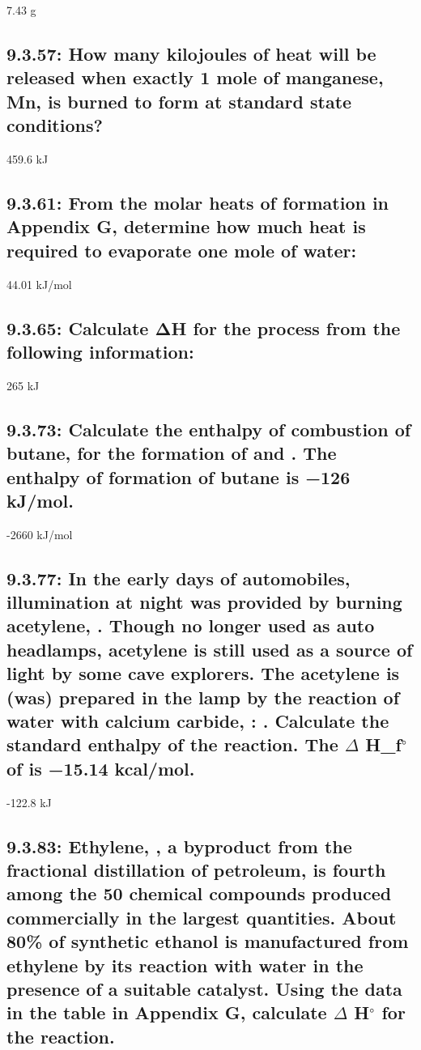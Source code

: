 \documentclass[11pt, letterpaper]{article}
\newcommand{\degree}{\ensuremath{{}^{\circ}}\xspace}
\begin{document}
7.43 g

\subsection*{9.3.57: How many kilojoules of heat will be released 
when exactly 1 mole of manganese, Mn, is burned to form 
 at standard state conditions?}

459.6 kJ

\subsection*{9.3.61: From the molar heats of formation in Appendix G, 
determine how much heat is required to evaporate one mole of water:
}

44.01 kJ/mol

\subsection*{9.3.65: Calculate ΔH for the process  
from the following information:
}

265 kJ

\subsection*{9.3.73: Calculate the enthalpy of combustion of butane, 
	 for the formation of  and . 
	The enthalpy of formation of butane is −126 kJ/mol.
}

-2660 kJ/mol

\subsection*{9.3.77: In the early days of automobiles, illumination at night was 
provided by burning acetylene, . Though no longer used as auto headlamps, 
acetylene is still used as a source of light by some cave explorers. 
The acetylene is (was) prepared in the lamp by the reaction of water 
with calcium carbide, :
.
Calculate the standard enthalpy of the reaction.
The $\Delta$ H_{f}\degree of  is −15.14 kcal/mol.}

-122.8 kJ

\subsection*{9.3.83: Ethylene, , a byproduct from the fractional
distillation of petroleum, is fourth among the 50 chemical compounds produced 
commercially in the largest quantities. About 80\% of synthetic ethanol is 
manufactured from ethylene by its reaction with water in the presence of a 
suitable catalyst.  
Using the data in the table in Appendix G, calculate $\Delta$ H\degree for the reaction.}
\end{document}
